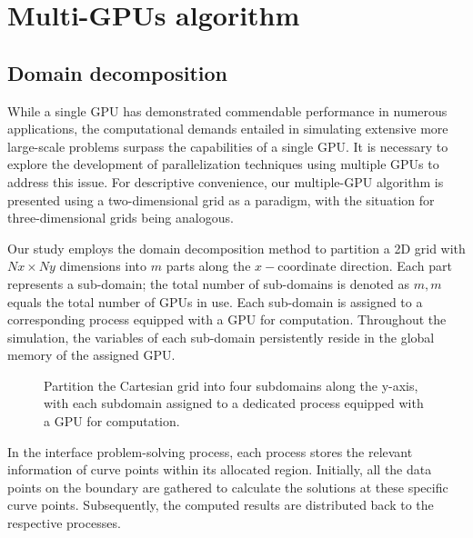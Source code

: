 \section{Multi-GPUs algorithm} \label{multi_GPU}
\subsection{Domain decomposition}

While a single GPU has demonstrated commendable performance in numerous applications, the computational demands entailed in simulating extensive more large-scale problems surpass the capabilities of a single GPU. It is necessary to explore the development of parallelization techniques using multiple GPUs to address this issue. For descriptive convenience, our multiple-GPU algorithm is presented using a two-dimensional grid as a paradigm, with the situation for three-dimensional grids being analogous.

Our study employs the domain decomposition method to partition a 2D grid with $Nx \times Ny$ dimensions into $m$ parts along the $x-$coordinate direction. Each part represents a sub-domain; the total number of sub-domains is denoted as $m, m$ equals the total number of GPUs in use. Each sub-domain is assigned to a corresponding process equipped with a GPU for computation. Throughout the simulation, the variables of each sub-domain persistently reside in the global memory of the assigned GPU.
\begin{figure}[ht]
    \caption{Partition the Cartesian grid into four subdomains along the y-axis, with each subdomain assigned to a dedicated process equipped with a GPU for computation.}
\end{figure}

In the interface problem-solving process, each process stores the relevant information of curve points within its allocated region. Initially, all the data points on the boundary are gathered to calculate the solutions at these specific curve points. Subsequently, the computed results are distributed back to the respective processes.

